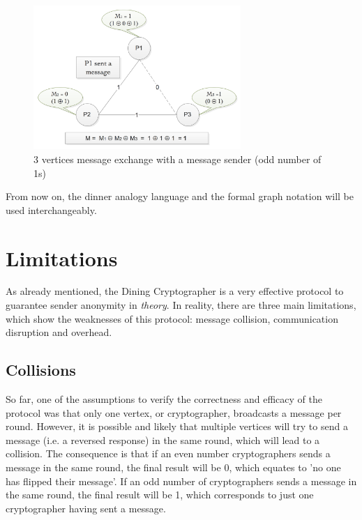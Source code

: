 \begin{figure}[h!]
    \centering
    \includegraphics[width=0.70\textwidth]{Images/DCFormalWithMessage.png}
    \caption{3 vertices message exchange with a message sender (odd number of 1s)}
    \label{fig:dcFormalWithMessage}
\end{figure}

From now on, the dinner analogy language and the formal graph notation will be used interchangeably. \newline \newline \newline

\section{Limitations}
As already mentioned, the Dining Cryptographer is a very effective protocol to guarantee sender anonymity in \textit{theory}. In reality, there are three main limitations, which show the weaknesses of this protocol: message collision, communication disruption and overhead. 

\subsection{Collisions}
So far, one of the assumptions to verify the correctness and efficacy of the protocol was that only one vertex, or cryptographer, broadcasts a message per round. However, it is possible and likely that multiple vertices will try to send a message (i.e. a reversed response) in the same round, which will lead to a collision. The consequence is that if an even number cryptographers sends a message in the same round, the final result will be 0, which equates to 'no one has flipped their message'. If an odd number of cryptographers sends a message in the same round, the final result will be 1, which corresponds to just one cryptographer having sent a message.

